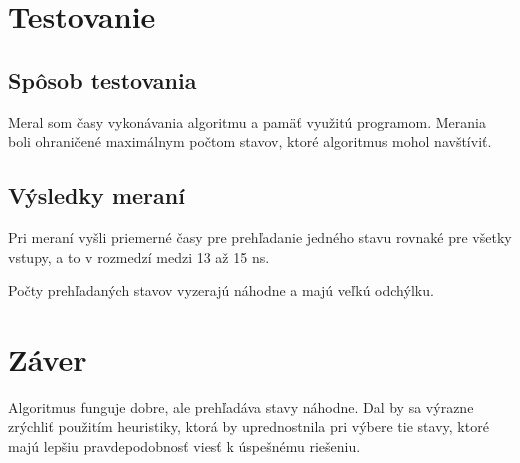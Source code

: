 \section{Testovanie}\label{sec:testovanie}

\subsection{Spôsob testovania}\label{subsec:spôsob-testovania}

Meral som časy vykonávania algoritmu a pamäť využitú programom.
Merania boli ohraničené maximálnym počtom stavov, ktoré algoritmus mohol navštíviť.

\subsection{Výsledky meraní}\label{subsec:výsledky}

Pri meraní vyšli priemerné časy pre prehľadanie jedného stavu rovnaké pre všetky vstupy, a to v rozmedzí medzi 13 až 15 ns.

Počty prehľadaných stavov vyzerajú náhodne a majú veľkú odchýlku.


\section{Záver}\label{sec:záver}
Algoritmus funguje dobre, ale prehľadáva stavy náhodne.
Dal by sa výrazne zrýchliť použitím heuristiky, ktorá by uprednostnila pri výbere tie stavy,
ktoré majú lepšiu pravdepodobnosť viesť k úspešnému riešeniu.






\endgroup